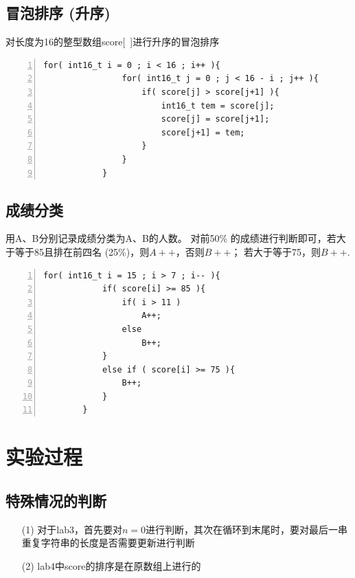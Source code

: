 \documentclass[UTF8]{ctexart}
\begin{document}
    \subsection{冒泡排序 (升序)}
    对长度为16的整型数组score[\ ]进行升序的冒泡排序
        \begin{lstlisting}[language={[ANSI]C},numbers=left, numberstyle=\tiny, keywordstyle=\color{blue!70}, commentstyle=\color{red!50!green!50!blue!50}, frame=shadowbox, rulesepcolor=\color{red!20!green!20!blue!20}]
            for( int16_t i = 0 ; i < 16 ; i++ ){
                for( int16_t j = 0 ; j < 16 - i ; j++ ){
                    if( score[j] > score[j+1] ){
                        int16_t tem = score[j];
                        score[j] = score[j+1];
                        score[j+1] = tem;
                    }
                }
            }
        \end{lstlisting}
    \subsection{成绩分类}
    用A、B分别记录成绩分类为A、B的人数。
    对前50\% 的成绩进行判断即可，若大于等于85且排在前四名 (25\%)，则$A++$，否则$B++$；
    若大于等于75，则$B++$.
    \begin{lstlisting}[language={[ANSI]C},numbers=left, numberstyle=\tiny, keywordstyle=\color{blue!70}, commentstyle=\color{red!50!green!50!blue!50}, frame=shadowbox, rulesepcolor=\color{red!20!green!20!blue!20}]
        for( int16_t i = 15 ; i > 7 ; i-- ){
            if( score[i] >= 85 ){
                if( i > 11 )
                    A++;
                else
                    B++;
            }
            else if ( score[i] >= 75 ){
                B++;
            }
        }
    \end{lstlisting}
    

\section{实验过程}
\subsection{特殊情况的判断}
\begin{enumerate}
    \item [(1)]对于lab3，首先要对$n=0$进行判断，其次在循环到末尾时，要对最后一串重复字符串的长度是否需要更新进行判断
    \item [(2)]lab4中score的排序是在原数组上进行的
\end{enumerate}
\end{document}
